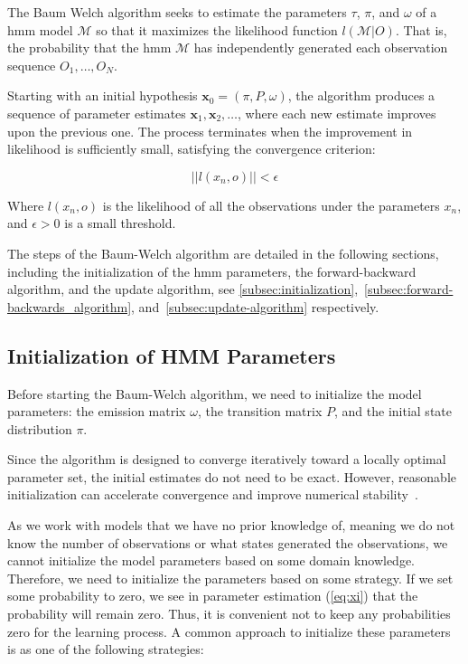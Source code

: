 The Baum Welch algorithm seeks to estimate the parameters $\tau$, $\pi$, and $\omega$ of a \gls{hmm} model $\mathcal{M}$ so that it maximizes the likelihood function $l(\mathcal{M} | O)$.
That is, the probability that the \gls{hmm} $\mathcal{M}$ has independently generated each observation sequence $O_1, \ldots, O_N$.

Starting with an initial hypothesis $\textbf{x}_0 = (\pi, P, \omega)$, the algorithm produces a sequence of parameter estimates $\textbf{x}_1, \textbf{x}_2, \ldots$, where each new estimate improves upon the previous one.
The process terminates when the improvement in likelihood is sufficiently small, satisfying the convergence criterion:

\[
    ||l(x_n, o)|| < \epsilon
\]

Where $l(x_n, o)$ is the likelihood of all the observations under the parameters $x_n$, and $\epsilon > 0$ is a small threshold.

The steps of the Baum-Welch algorithm are detailed in the following sections, including the initialization of the \gls{hmm} parameters, the forward-backward algorithm, and the update algorithm, see \autoref{subsec:initialization},~\ref{subsec:forward-backwards_algorithm}, and~\ref{subsec:update-algorithm} respectively.

\subsection{Initialization of HMM Parameters}\label{subsec:initialization}
Before starting the Baum-Welch algorithm, we need to initialize the model parameters: the emission matrix $\omega$, the transition matrix $P$, and the initial state distribution $\pi$.

Since the algorithm is designed to converge iteratively toward a locally optimal parameter set, the initial estimates do not need to be exact.
However, reasonable initialization can accelerate convergence and improve numerical stability~\cite{benyacoub2015initial}.

As we work with models that we have no prior knowledge of, meaning we do not know the number of observations or what states generated the observations, we cannot initialize the model parameters based on some domain knowledge.
Therefore, we need to initialize the parameters based on some strategy.
If we set some probability to zero, we see in parameter estimation (\autoref{eq:xi}) that the probability will remain zero. Thus, it is convenient not to keep any probabilities zero for the learning process.
A common approach to initialize these parameters is as one of the following strategies:

